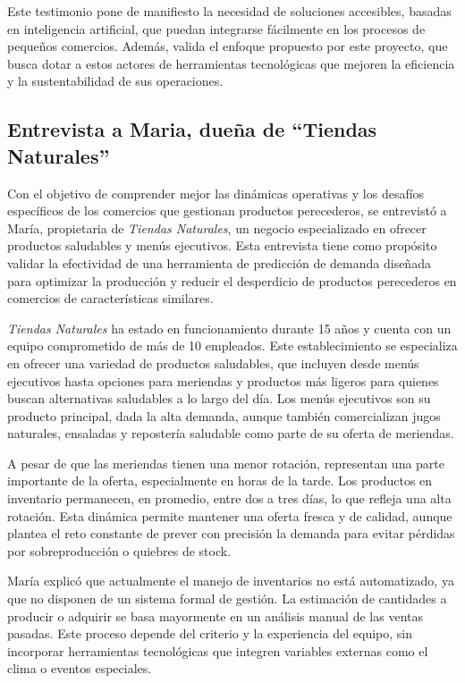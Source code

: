 Este testimonio pone de manifiesto la necesidad de soluciones accesibles, basadas en inteligencia artificial, que puedan integrarse fácilmente en los procesos de pequeños comercios. Además, valida el enfoque propuesto por este proyecto, que busca dotar a estos actores de herramientas tecnológicas que mejoren la eficiencia y la sustentabilidad de sus operaciones.


\subsection{Entrevista a Maria, dueña de ``Tiendas Naturales''}

Con el objetivo de comprender mejor las dinámicas operativas y los desafíos específicos de los comercios que gestionan productos perecederos, se entrevistó a María, propietaria de \textit{Tiendas Naturales}, un negocio especializado en ofrecer productos saludables y menús ejecutivos. Esta entrevista tiene como propósito validar la efectividad de una herramienta de predicción de demanda diseñada para optimizar la producción y reducir el desperdicio de productos perecederos en comercios de características similares.

\indent \textit{Tiendas Naturales} ha estado en funcionamiento durante 15 años y cuenta con un equipo comprometido de más de 10 empleados. Este establecimiento se especializa en ofrecer una variedad de productos saludables, que incluyen desde menús ejecutivos hasta opciones para meriendas y productos más ligeros para quienes buscan alternativas saludables a lo largo del día. Los menús ejecutivos son su producto principal, dada la alta demanda, aunque también comercializan jugos naturales, ensaladas y repostería saludable como parte de su oferta de meriendas.

\indent A pesar de que las meriendas tienen una menor rotación, representan una parte importante de la oferta, especialmente en horas de la tarde. Los productos en inventario permanecen, en promedio, entre dos a tres días, lo que refleja una alta rotación. Esta dinámica permite mantener una oferta fresca y de calidad, aunque plantea el reto constante de prever con precisión la demanda para evitar pérdidas por sobreproducción o quiebres de stock.

\indent María explicó que actualmente el manejo de inventarios no está automatizado, ya que no disponen de un sistema formal de gestión. La estimación de cantidades a producir o adquirir se basa mayormente en un análisis manual de las ventas pasadas. Este proceso depende del criterio y la experiencia del equipo, sin incorporar herramientas tecnológicas que integren variables externas como el clima o eventos especiales.

